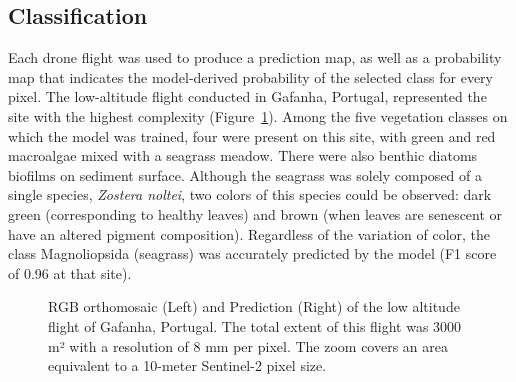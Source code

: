 \documentclass[
  number]{elsarticle}
\begin{document}
\subsection{Classification}\label{classification}

Each drone flight was used to produce a prediction map, as well as a
probability map that indicates the model-derived probability of the
selected class for every pixel. The low-altitude flight conducted in
Gafanha, Portugal, represented the site with the highest complexity
(Figure~\ref{fig-GafLow}). Among the five vegetation classes on which
the model was trained, four were present on this site, with green and
red macroalgae mixed with a seagrass meadow. There were also benthic
diatoms biofilms on sediment surface. Although the seagrass was solely
composed of a single species, \emph{Zostera noltei}, two colors of this
species could be observed: dark green (corresponding to healthy leaves)
and brown (when leaves are senescent or have an altered pigment
composition). Regardless of the variation of color, the class
Magnoliopsida (seagrass) was accurately predicted by the model (F1 score
of 0.96 at that site).

\label{cell-fig-GafLow}
\begin{figure}[H]


\caption{\label{fig-GafLow}RGB orthomosaic (Left) and Prediction (Right)
of the low altitude flight of Gafanha, Portugal. The total extent of
this flight was 3000 m² with a resolution of 8 mm per pixel. The zoom
covers an area equivalent to a 10-meter Sentinel-2 pixel size.}

\end{figure}%
\end{document}
